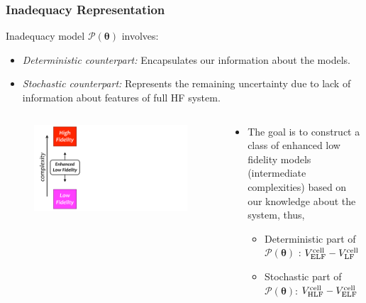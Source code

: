 \documentclass[10pt,xcolor=dvipsnames,compress]{beamer}
\begin{document}
\begin{frame}
\frametitle{Inadequacy Representation}
\vfill


Inadequacy model $\mathcal{P}(\boldsymbol{\theta})$ involves:
\begin{itemize}
\item \textit{Deterministic counterpart:}
Encapsulates our information about the models.

\item \textit{Stochastic counterpart:}
Represents the remaining uncertainty due to lack of information about features of full HF system.
\end{itemize}

\begin{columns}
\begin{figure}[h]
    \centering
    \includegraphics[trim = 0.in 0.in 9.in 0in, clip, width=1\textwidth]{figs/ELFmodel.pdf} 
\end{figure}


\begin{block}{}

\begin{itemize}
\item The goal is to construct a class of enhanced low fidelity models (intermediate complexities) based on our knowledge about the system, thus,

\begin{itemize}
\item Deterministic part of $\mathcal{P}(\boldsymbol{\theta})$ :
$V^{\rm cell}_{\rm ELF} -  V^{\rm cell}_{\rm LF}$
\item Stochastic part of $\mathcal{P}(\boldsymbol{\theta})$: 
$V^{\rm cell}_{\rm HLF} -  V^{\rm cell}_{\rm ELF}$
\end{itemize}



\end{itemize}
\end{block}
\end{columns}
\end{frame}
\end{document}
